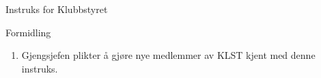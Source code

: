 \begin{instruks}{Instruks for Klubbstyret}{ }{ }
    \begin{instruksledd}{Formidling}
        \begin{enumerate}
            \item Gjengsjefen plikter å gjøre nye medlemmer av KLST kjent med denne instruks.
        \end{enumerate}
    \end{instruksledd}


\end{instruks}



